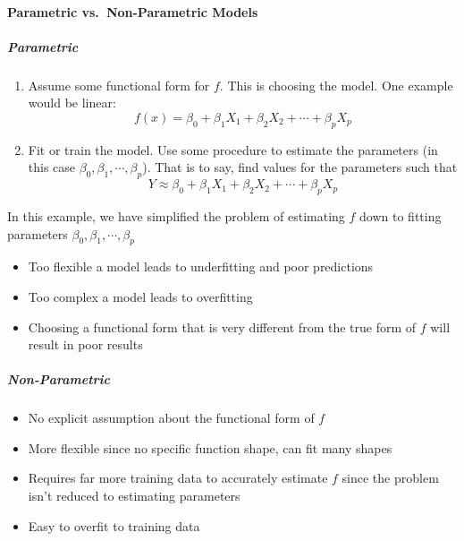 \paragraph*{Parametric vs.~Non-Parametric Models}\label{parametric-vs.-non-parametric-models}

\subparagraph{Parametric}\label{parametric}

\begin{enumerate}
\tightlist
\item  Assume some functional form for \(f\). This is choosing the model. One
  example would be linear:
  \begin{equation*}
	f(x) = \beta_0 + \beta_1 X_1 + \beta_2 X_2 + \cdots + \beta_p X_p
  \end{equation*}
  \item  Fit or train the model. Use some procedure to estimate the parameters
  (in this case \(\beta_0, \beta_1, \cdots, \beta_p\)). That is to say, find values for the parameters such that
  \begin{equation*}
		Y \approx  \beta_0 + \beta_1 X_1 + \beta_2 X_2 + \cdots + \beta_p X_p
  \end{equation*}

\end{enumerate}


In this example, we have simplified the problem of estimating \(f\) down to fitting parameters \(\beta_0, \beta_1, \cdots, \beta_p\)
\begin{itemize}
    \tightlist
    \item Too flexible a model leads to underfitting and poor predictions
    \item Too complex a model leads to overfitting
    \item Choosing a functional form that is very different from the true form of \(f\) will result in poor results
\end{itemize}

\subparagraph{Non-Parametric}
\begin{itemize}
    \tightlist
    \item No explicit assumption about the    functional form of \(f\)
    \item More flexible since no specific function shape, can fit many shapes
    \item Requires far more training data to     accurately estimate \(f\) since the problem isn't reduced to estimating    parameters 
    \item Easy to overfit to training data
\end{itemize}

